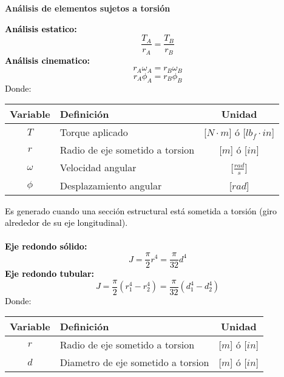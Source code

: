 \documentclass[letterpaper,11pt]{extarticle}
\newcommand{\mybox}[2]
{
    \begin{tcolorbox}[colback=color!5!white,colframe=color!75!black,boxsep=1pt,arc=0pt,outer arc=0pt,title={\textcolor{white}{#1}}]
        \textcolor{black}{#2}
    \end{tcolorbox}
}
\begin{document}
    \newpage

    \begin{center} 
        \textbf{Análisis de elementos sujetos a torsión} 
    \end{center}
    \begin{multicols}{2}
        \mybox{Relación de engranajes:}
        {
            \textbf{Análisis estatico:}
            \begin{equation}
                \frac{T_A}{r_A} = \frac{T_B}{r_B}
            \end{equation}
            \textbf{Análisis cinematico:}
            \begin{equation}
                r_A \omega_A = r_B \omega_B
            \end{equation}
            \begin{equation}
                r_A \phi_A = r_B \phi_B
            \end{equation}
            Donde: 
            \begin{center}
                \begin{tabular}{ c | p{28mm} | c }
                    \hline Variable & Definición & Unidad \\ \hline 
                    $T$ & Torque aplicado & [$N \cdot m$] ó [$lb_f \cdot in$]\\
                    $r$ & Radio de eje sometido a torsion & [$m$] ó [$in$]\\
                    $\omega$ & Velocidad angular  & [$\frac{rad}{s}$]\\
                    $\phi$ & Desplazamiento angular  & [$rad$]\\ \hline
                \end{tabular}
            \end{center}
        }
        \mybox{Momento polar de inercia ($J$):}
        {
            Es generado cuando una sección estructural está sometida a torsión (giro alrededor de su eje longitudinal). \\\\
            \textbf{Eje redondo sólido:}
            \begin{equation}
                J = \frac{\pi}{2}r^4 = \frac{\pi}{32}d^4
            \end{equation}
            \textbf{Eje redondo tubular:}
            \begin{equation}
                J = \frac{\pi}{2}\left(r_1^4 - r_2^4\right) = \frac{\pi}{32}\left(d_1^4 - d_2^4\right)
            \end{equation}
            Donde:
            \begin{center}
                \begin{tabular}{ c | p{35mm} | c }
                    \hline Variable & Definición & Unidad \\ \hline 
                    $r$ & Radio de eje sometido a torsion & [$m$] ó [$in$]\\
                    $d$ & Diametro de eje sometido a torsion & [$m$] ó [$in$]\\ \hline
                \end{tabular}
            \end{center}
        }
        

\end{multicols}
\end{document}
